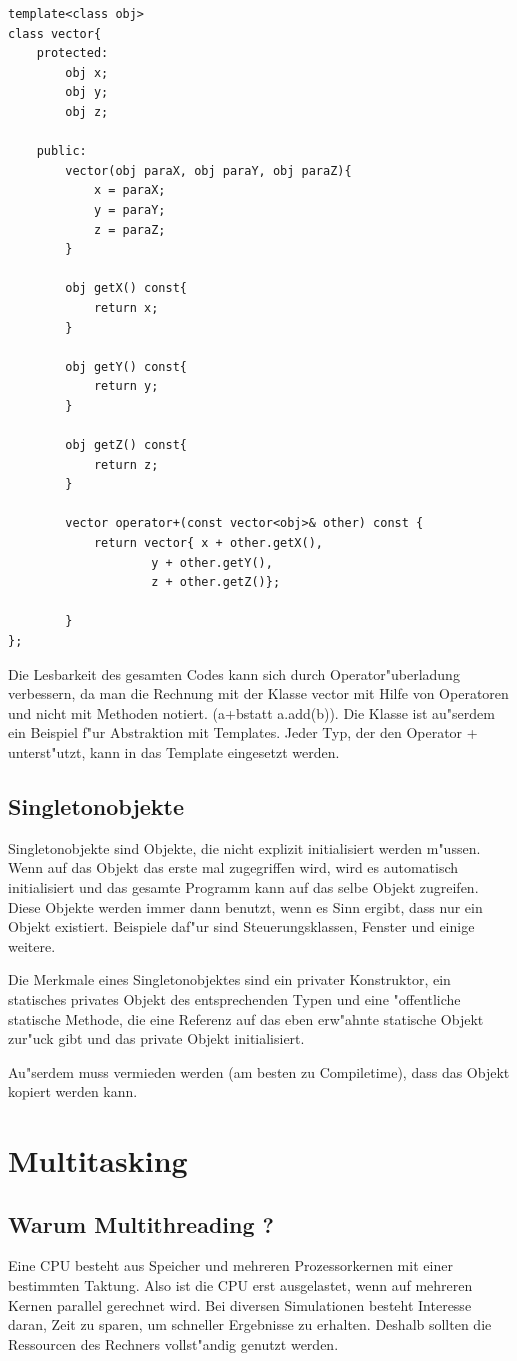 \documentclass[14pt, a4paper]{report}
\begin{document}
\begin{lstlisting}
template<class obj>
class vector{
	protected:
		obj x;
		obj y;
		obj z;

	public:
		vector(obj paraX, obj paraY, obj paraZ){
			x = paraX;
			y = paraY;
			z = paraZ;
		}

		obj getX() const{
			return x;
		}

		obj getY() const{
			return y;
		}
		
		obj getZ() const{
			return z;
		}
		
		vector operator+(const vector<obj>& other) const {
			return vector{ x + other.getX(), 
					y + other.getY(), 
					z + other.getZ()}; 

		}
};
\end{lstlisting}

Die Lesbarkeit des gesamten Codes kann sich durch Operator"uberladung verbessern, da man
die Rechnung mit der Klasse vector mit Hilfe von Operatoren und nicht mit Methoden notiert.
(\glqq a+b\grqq statt \glqq a.add(b)\grqq). Die Klasse ist au"serdem ein Beispiel f"ur 
Abstraktion mit Templates. Jeder
Typ, der den Operator + unterst"utzt, kann in das Template eingesetzt werden.

\section{Singletonobjekte}
Singletonobjekte sind Objekte, die nicht explizit initialisiert werden m"ussen. Wenn auf
das Objekt das erste mal zugegriffen wird, wird es automatisch initialisiert und das
gesamte Programm kann auf das selbe Objekt zugreifen. Diese Objekte werden immer
dann benutzt, wenn es Sinn ergibt, dass nur ein Objekt existiert. Beispiele daf"ur
sind Steuerungsklassen, Fenster und einige weitere.

Die Merkmale eines Singletonobjektes sind ein privater Konstruktor, ein statisches 
privates Objekt des entsprechenden Typen und eine "offentliche statische Methode, die 
eine Referenz auf das eben erw"ahnte statische Objekt zur"uck gibt und das private
Objekt initialisiert.

Au"serdem muss vermieden werden (am besten zu Compiletime), dass das Objekt 
kopiert werden kann.

\chapter{Multitasking}
\section{Warum Multithreading ?}
Eine CPU besteht aus Speicher und mehreren Prozessorkernen mit einer bestimmten
Taktung. Also ist die CPU erst ausgelastet, wenn auf mehreren Kernen parallel
gerechnet wird. Bei diversen Simulationen besteht Interesse daran, Zeit zu sparen, um
schneller Ergebnisse zu erhalten. Deshalb sollten die Ressourcen des Rechners 
vollst"andig genutzt werden.
\end{document}
